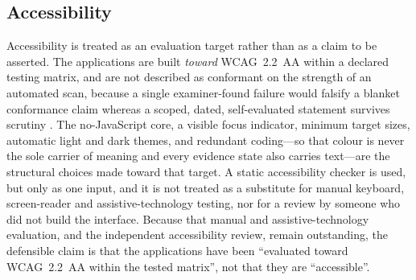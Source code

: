 \subsection{Accessibility}
\label{sec:a11y}
Accessibility is treated as an evaluation target rather than as a claim to be asserted. The applications
are built \emph{toward} WCAG~2.2~AA within a declared testing matrix, and are not described as conformant
on the strength of an automated scan, because a single examiner-found failure would falsify a blanket
conformance claim whereas a scoped, dated, self-evaluated statement survives scrutiny
\cite{power2012, wcag22}. The no-JavaScript core, a visible focus indicator, minimum target sizes,
automatic light and dark themes, and redundant coding---so that colour is never the sole carrier of
meaning and every evidence state also carries text---are the structural choices made toward that target.
A static accessibility checker is used, but only as one input, and it is not treated as a substitute for
manual keyboard, screen-reader and assistive-technology testing, nor for a review by someone who did not
build the interface. Because that manual and assistive-technology evaluation, and the independent
accessibility review, remain outstanding, the defensible claim is that the applications have been
``evaluated toward WCAG~2.2~AA within the tested matrix'', not that they are ``accessible''.
